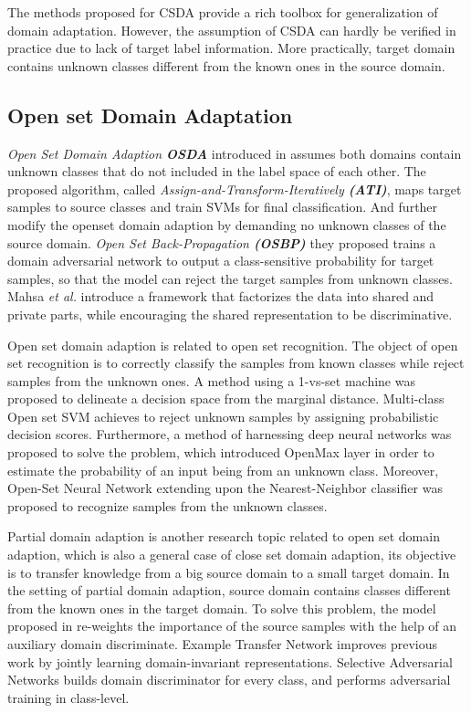The methods proposed for CSDA provide a rich toolbox for generalization of domain adaptation. 
However, the assumption of CSDA can hardly be verified in practice due to lack of target label information. 
More practically, target domain contains unknown classes different from the known ones in the source domain. 


\subsection{Open set Domain Adaptation}
\textit{Open Set Domain Adaption \textbf{OSDA}} introduced in \cite{OpensetsDA} assumes both domains contain unknown classes that do not included in the label space of each other. 
The proposed algorithm, called \textit{Assign-and-Transform-Iteratively \textbf{(ATI)}}, maps target samples to source classes and train SVMs for final classification. 
And \cite{OpensetDA-bp, PDA-sep} further modify the openset domain adaption by demanding no unknown classes of the source domain. 
\textit{Open Set Back-Propagation \textbf{(OSBP)}} they proposed trains a domain adversarial network to output a class-sensitive probability for target samples, so that the model can reject the target samples from unknown classes. 
Mahsa \textit{et al.} introduce a framework \cite{PDA-fac} that factorizes the data into shared and private parts, while encouraging the shared representation to be discriminative. 

Open set domain adaption is related to open set recognition. 
The object of open set recognition is to correctly classify the samples from known classes while reject  samples from the unknown ones. 
A method using a 1-vs-set machine \cite{scheirer2012toward} was proposed to delineate a decision space from the marginal distance. Multi-class Open set SVM \cite{OSVM} achieves to reject unknown samples by assigning probabilistic decision scores. 
Furthermore, a method of harnessing deep neural networks \cite{bendale2016towards} was proposed to solve the problem, which introduced OpenMax layer in order to estimate the probability of an input being from an unknown class. 
Moreover, Open-Set Neural Network \cite{junior2017nearest} extending upon the Nearest-Neighbor classifier was proposed to recognize samples from the unknown classes. 

Partial domain adaption \cite{OpensetsDA} is another research topic related to open set domain adaption, which is also a general case of close set domain adaption, its objective is to transfer knowledge from a big source domain to a small target domain. 
In the setting of partial domain adaption, source domain contains classes different from the known ones in the target domain. 
To solve this problem, the model proposed in \cite{PartialDA-iw} re-weights the importance of the source samples with the help of an auxiliary domain discriminate. 
Example Transfer Network \cite{Partial-ENT} improves previous work by jointly learning domain-invariant representations. 
Selective Adversarial Networks \cite{PartialDA-san} builds domain discriminator for every class, and performs adversarial training in class-level.


